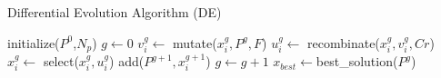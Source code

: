 \begin{algorithm}[tb]
\scriptsize
    \caption{Differential Evolution Algorithm (DE)} \label{alg:algoritmoDE}
    \begin{algorithmic} [1]
        \State initialize($P^0$,$N_p$) 
        \State $g \leftarrow 0$
                \State $v_{i}^g \leftarrow $ mutate($x_{i}^g, P^g, F$) 
                \State $u_{i}^g \leftarrow $ recombinate($x_{i}^g, v_{i}^g, Cr$)
                \State $x_{i}^g \leftarrow $ select($x_{i}^g, u_{i}^g$)
                \State add($P^{g+1}, x_{i}^{g+1}$) 
            \EndFor
            \State $g \leftarrow g+1$ 
        \EndWhile
        \State$x_{best} \leftarrow $best\_solution($P^{g}$)
    \end{algorithmic}
\end{algorithm}



